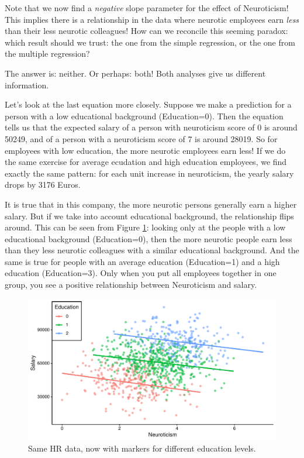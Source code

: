 \documentclass[]{book}\usepackage[]{graphicx}\usepackage[]{color}
\makeatletter
\def\maxwidth{ %
  \ifdim\Gin@nat@width>\linewidth
    \linewidth
  \else
    \Gin@nat@width
  \fi
}
\newenvironment{knitrout}{}{} %
\makeatother
\begin{document}
Note that we now find a \textit{negative} slope parameter for the effect of Neuroticism! This implies there is a relationship in the data where neurotic employees earn \textit{less} than their less neurotic colleagues! How can we reconcile this seeming paradox: which result should we trust: the one from the simple regression, or the one from the multiple regression?

The answer is: neither. Or perhaps: both! Both analyses give us different information.

Let's look at the last equation more closely. Suppose we make a prediction for a person with a low educational background (Education=0). Then the equation tells us that the expected salary of a person with neuroticism score of 0 is around 50249, and of a person with a neuroticism score of 7 is around 28019. So for employees with low education, the more neurotic employees earn less! If we do the same exercise for average ecudation and high education employees, we find exactly the same pattern: for each unit increase in neuroticism, the yearly salary drops by 3176 Euros.


It is true that in this company, the more neurotic persons generally earn a higher salary. But if we take into account educational background, the relationship flips around. This can be seen from Figure \ref{fig:multi_5}: looking only at the people with a low educational background (Education=0), then the more neurotic people earn less than they less neurotic colleagues with a similar educational background. And the same is true for people with an average education (Education=1) and a high education (Education=3). Only when you put all employees together in one group, you see a positive relationship between Neuroticism and salary.


\begin{knitrout}
\color{fgcolor}\begin{figure}

{\centering \includegraphics[width=\maxwidth]{figure/multi_5-1} 

}

\caption[Same HR data, now with markers for different education levels]{Same HR data, now with markers for different education levels.}\label{fig:multi_5}
\end{figure}


\end{knitrout}
\end{document}
